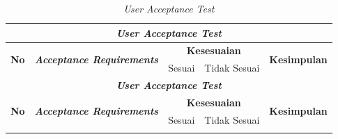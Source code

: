 \begin{longtable}[c]{|p{1cm}|p{6.5cm}|p{2cm}|p{2cm}|p{2cm}|}
    \caption{\textit{User Acceptance Test} \label{user_acceptance_testing}}\\
   
    \hline
    \multicolumn{5}{|c|}{\textbf{\textit{User Acceptance Test}}} \\
    \hline
    \multirow{2}{*}{\centering\textbf{No}} & 
    \multirow{2}{*}{\centering\textbf{\textit{Acceptance Requirements}}} & 
    \multicolumn{2}{c|}{\textbf{Kesesuaian}} & 
    \multirow{2}{*}{\centering\textbf{Kesimpulan}} \\
    \cline{3-4}
     & & \centering Sesuai & Tidak Sesuai &  \\
    \hline
    \endfirsthead
   
    \hline
    \multicolumn{5}{|c|}{\textbf{\textit{User Acceptance Test}}} \\
    \hline
    \multirow{2}{*}{\centering\textbf{No}} & 
    \multirow{2}{*}{\centering\textbf{\textit{Acceptance Requirements}}} & 
    \multicolumn{2}{c|}{\textbf{Kesesuaian}} & 
    \multirow{2}{*}{\centering\textbf{Kesimpulan}} \\
    \cline{3-4}
     & & \centering Sesuai & Tidak Sesuai &  \\
    \hline
    \endhead
   
    \hline
    \endfoot
   
    \hline
    \endlastfoot
   

\end{longtable}
